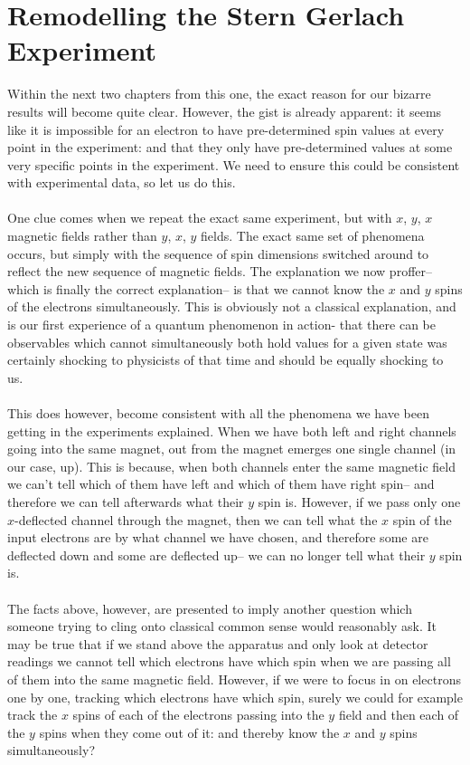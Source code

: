 \section{Remodelling the Stern Gerlach Experiment}
Within the next two chapters from this one, the exact reason for our bizarre results will become quite clear. However, the gist is already apparent: it seems like it is impossible for an electron to have pre-determined spin values at every point in the experiment: and that they only have pre-determined values at some very specific points in the experiment. We need to ensure this could be consistent with experimental data, so let us do this.
\\\\
One clue comes when we repeat the exact same experiment, but with $x$, $y$, $x$ magnetic fields rather than $y$, $x$, $y$ fields. The exact same set of  phenomena occurs, but simply with the sequence of spin dimensions switched around to reflect the new sequence of magnetic fields. The explanation we now proffer-- which is finally the correct explanation-- is that we cannot know the $x$ and $y$ spins of the electrons simultaneously. This is obviously not a classical explanation, and is our first experience of a quantum phenomenon in action- that there can be observables which cannot simultaneously both hold values for a given state was certainly shocking to physicists of that time and should be equally shocking to us. 
\\\\
This does however, become consistent with all the phenomena we have been getting in the experiments explained. When we have both left and right channels going into the same magnet, out from the magnet emerges one single channel (in our case, up). This is because, when both channels enter the same magnetic field we can't tell which of them have left and which of them have right spin-- and therefore we can tell afterwards what their $y$ spin is. However, if we pass only one $x$-deflected channel through the magnet, then we can tell what the $x$ spin of the input electrons are by what channel we have chosen, and therefore some are deflected down and some are deflected up-- we can no longer tell what their $y$ spin is. 
\\\\
The facts above, however, are presented to imply another question which someone trying to cling onto classical common sense would reasonably ask. It may be true that if we stand above the apparatus and only look at detector readings we cannot tell which electrons have which spin when we are passing all of them into the same magnetic field. However, if we were to focus in on electrons one by one, tracking which electrons have which spin, surely we could for example track the $x$ spins of each of the electrons passing into the $y$ field and then each of the $y$ spins when they come out of it: and thereby know the $x$ and $y$ spins simultaneously?
